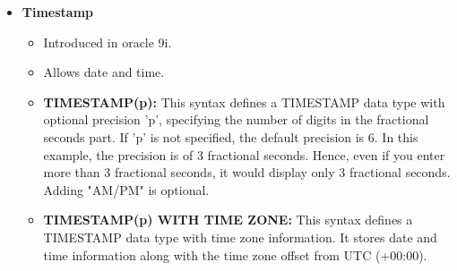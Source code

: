 \begin{flushleft}
\begin{itemize}
			\newpage
			
			\item \textbf{Timestamp}
			\begin{itemize}
				\item Introduced in oracle 9i.
				\item Allows date and time.
				\bigskip
				\item \textbf{TIMESTAMP(p):} This syntax defines a TIMESTAMP data type with optional precision 'p', specifying the number of digits in the fractional seconds part. If 'p' is not specified, the default precision is 6.
				In this example, the precision is of 3 fractional seconds. Hence, even if you enter more than 3 fractional seconds, it would display only 3 fractional seconds. Adding "AM/PM" is optional.
				\bigskip
				\item \textbf{TIMESTAMP(p) WITH TIME ZONE:} This syntax defines a TIMESTAMP data type with time zone information. It stores date and time information along with the time zone offset from UTC (+00:00).
\end{itemize}
\end{itemize}
\end{flushleft}
